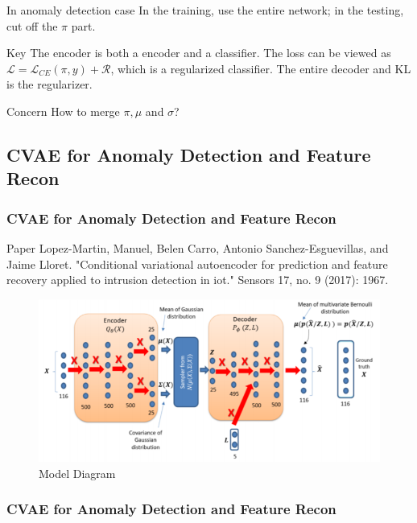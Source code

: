 \documentclass{beamer}
\begin{document}
\begin{frame}
\begin{frame}
\begin{frame}
\begin{frame}
\begin{frame}
\begin{block}{In anomaly detection case}
In the training, use the entire network; in the testing, cut off the $\pi$ part.
\end{block}

\begin{block}{Key}
The encoder is both a encoder and a classifier. The loss can be viewed as
$\mathcal{L} = \mathcal{L}_{CE}(\pi, y) + \mathcal{R}$, which is a regularized classifier. The entire decoder and KL is the regularizer.
\end{block}

\begin{block}{Concern}
How to merge $\pi, \mu$ and $\sigma$?
\end{block}

\end{frame}


\subsection{CVAE for Anomaly Detection and Feature Recon}
\begin{frame}
\frametitle{CVAE for Anomaly Detection and Feature Recon}
\begin{block}{Paper}
Lopez-Martin, Manuel, Belen Carro, Antonio Sanchez-Esguevillas, and Jaime Lloret. "Conditional variational autoencoder for prediction and feature recovery applied to intrusion detection in iot." Sensors 17, no. 9 (2017): 1967.
\end{block}

\begin{figure}
\includegraphics[width=0.8\linewidth]{figs/cvae_diagram.png}
\caption{Model Diagram}
\end{figure}

\end{frame}

\begin{frame}
\frametitle{CVAE for Anomaly Detection and Feature Recon}


\end{frame}
\end{frame}
\end{frame}
\end{frame}
\end{frame}
\end{document}

